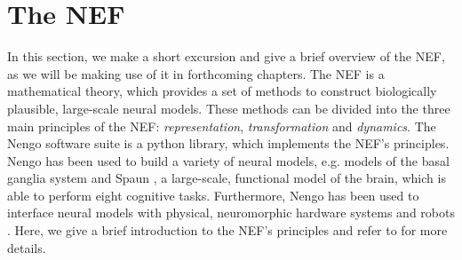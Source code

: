 \section{The \acl{NEF}}
\label{sec:neural_eng}

In this section, we make a short excursion and give a brief overview of the \acf{NEF}, as we will be making use of it in forthcoming chapters.
The \ac{NEF} \cite{Eliasmith2003} is a mathematical theory, which provides a set of methods to construct biologically plausible, large-scale neural models.
These methods can be divided into the three main principles of the \ac{NEF}: \emph{representation}, \emph{transformation} and \emph{dynamics}.
The \ac{Nengo} \cite{Bekolay2014, Nengo} software suite is a python library, which implements the \ac{NEF}'s principles.
\ac{Nengo} has been used to build a variety of neural models, e.g. models of the basal ganglia system \cite{Stewart2010, Stewart2012} and \acf{Spaun} \cite{Eliasmith2012}, a large-scale, functional model of the brain, which is able to perform eight cognitive tasks.
Furthermore, \ac{Nengo} has been used to interface neural models with physical, neuromorphic hardware systems and robots \cite{Conradt2014, Stewart2016, Mirus2018a}.
Here, we give a brief introduction to the \ac{NEF}'s principles and refer to \cite{Eliasmith2003, Eliasmith2013, Bekolay2014} for more details.
